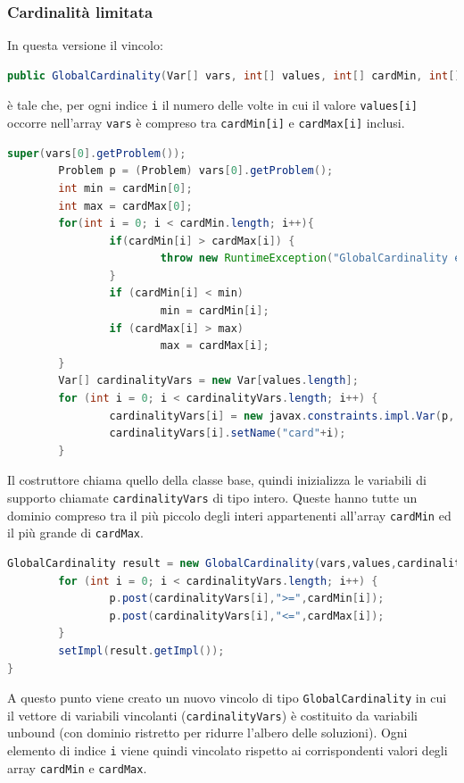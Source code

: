 \subsubsection*{Cardinalità limitata}
In questa versione il vincolo:
\begin{lstlisting}[language = Java, frame = single]
public GlobalCardinality(Var[] vars, int[] values, int[] cardMin, int[] cardMax)
\end{lstlisting}
è tale che, per ogni indice \texttt{i} il numero delle volte in cui il valore
\texttt{values[i]} occorre nell'array \texttt{vars} è compreso tra
\texttt{cardMin[i]} e \texttt{cardMax[i]} inclusi.

\begin{lstlisting}[language = Java,
                   caption = {inizializzazione delle variabili.}]
        super(vars[0].getProblem());
        Problem p = (Problem) vars[0].getProblem();
        int min = cardMin[0];
        int max = cardMax[0];
        for(int i = 0; i < cardMin.length; i++){
                if(cardMin[i] > cardMax[i]) {
                        throw new RuntimeException("GlobalCardinality error: cardMin["+i+"] <= cardMax["+i+"]");
                }
                if (cardMin[i] < min)
                        min = cardMin[i];
                if (cardMax[i] > max)
                        max = cardMax[i];
        }
        Var[] cardinalityVars = new Var[values.length];
        for (int i = 0; i < cardinalityVars.length; i++) {
                cardinalityVars[i] = new javax.constraints.impl.Var(p, min, max);
                cardinalityVars[i].setName("card"+i);
        }
\end{lstlisting}
Il costruttore chiama quello della classe base, quindi inizializza le variabili
di supporto chiamate \texttt{cardinalityVars} di tipo intero. Queste hanno
tutte un dominio compreso tra il più piccolo degli interi appartenenti all'array
\texttt{cardMin} ed il più grande di \texttt{cardMax}.
\begin{lstlisting}[language = Java,
                   caption = {costruzione del vincolo.}]
        GlobalCardinality result = new GlobalCardinality(vars,values,cardinalityVars);
        for (int i = 0; i < cardinalityVars.length; i++) {
                p.post(cardinalityVars[i],">=",cardMin[i]);
                p.post(cardinalityVars[i],"<=",cardMax[i]);
        }
        setImpl(result.getImpl());
}
\end{lstlisting}
A questo punto viene creato un nuovo vincolo di tipo
\texttt{GlobalCardinality} in cui il vettore di variabili vincolanti 
(\texttt{cardinalityVars}) è costituito da variabili unbound (con dominio 
ristretto per ridurre l'albero delle soluzioni). Ogni elemento di indice
\texttt{i} viene quindi vincolato rispetto ai corrispondenti valori
degli array \texttt{cardMin} e \texttt{cardMax}.

